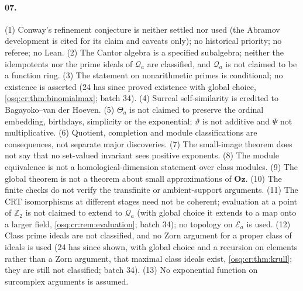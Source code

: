 \documentclass[11pt,letterpaper]{article}
\numberwithin{equation}{section}
\theoremstyle{definition}
\theoremstyle{remark}
\theoremstyle{plain}
\newcommand{\Oz}{\mathbf{Oz}}
\newcommand{\Z}{\mathbb Z}
\newcommand{\EE}{\mathscr E}         %
\newcommand{\Qa}{\mathcal Q}         %
\begin{document}
\paragraph{07.} (1) Conway's refinement conjecture is neither settled nor used (the Abramov
development \cite{Abramov} is cited for its claim and caveats only); no historical priority; no referee;
no Lean. (2) The Cantor algebra is a specified subalgebra; neither the idempotents nor the prime ideals
of $\Qa_a$ are classified, and $\Qa_a$ is not claimed to be a function ring. (3) The statement on
nonarithmetic primes is conditional; no existence is asserted (24 has since proved existence with global choice, \cref{osq:cr:thm:binomialmax};
batch 34). (4) Surreal self-similarity is credited
to Bagayoko--van der Hoeven. (5) $\Theta_a$ is not claimed to preserve the ordinal embedding,
birthdays, simplicity or the exponential; $\vartheta$ is not additive and $\Psi$ not multiplicative.
(6) Quotient, completion and module classifications are consequences, not separate major discoveries.
(7) The small-image theorem does not say that no set-valued invariant sees positive exponents. (8) The
module equivalence is not a homological-dimension statement over class modules. (9) The global theorem
is not a theorem about small approximations of $\Oz$. (10) The finite checks do not verify the
transfinite or ambient-support arguments. (11) The CRT isomorphisms at different stages need not be
coherent; evaluation at a point of $\Z_2$ is not claimed to extend to $\Qa_a$ (with global choice it extends to a map onto a larger
field, \cref{osq:cr:rem:evaluation}; batch 34); no topology on $\EE_a$
is used. (12) Class prime ideals are not classified, and no Zorn argument for a proper class of
ideals is used (24 has since shown, with global choice and a recursion on elements rather than a Zorn argument, that maximal class ideals
exist, \cref{osq:cr:thm:krull}; they are still not classified; batch 34). (13) No exponential function on surcomplex arguments is assumed.
\end{document}
